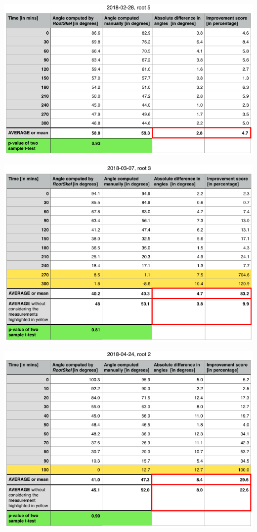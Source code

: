 \begin{table}[H]
	
	\centering
	
	\includegraphics[width=\textwidth]{../Figures/2018-02-28-stats-new.png}
	
	\includegraphics[width=\textwidth]{../Figures/2018-03-07-stats-new.png}
	
	\includegraphics[width=\textwidth]{../Figures/2018-04-24-stats-new.png}
	

\end{table}
